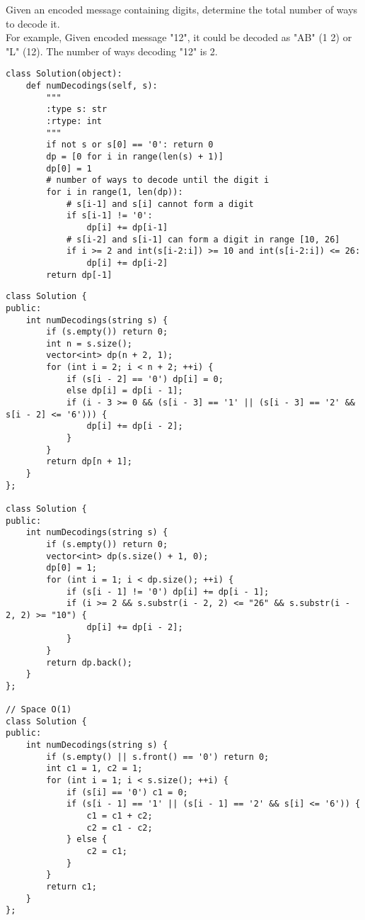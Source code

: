 Given an encoded message containing digits, determine the total number of ways to decode it.\\

For example,
Given encoded message "12", it could be decoded as "AB" (1 2) or "L" (12). The number of ways decoding "12" is 2. \\

\begin{lstlisting}
class Solution(object):
    def numDecodings(self, s):
        """
        :type s: str
        :rtype: int
        """
        if not s or s[0] == '0': return 0
        dp = [0 for i in range(len(s) + 1)]
        dp[0] = 1
        # number of ways to decode until the digit i
        for i in range(1, len(dp)):
            # s[i-1] and s[i] cannot form a digit
            if s[i-1] != '0':
                dp[i] += dp[i-1]
            # s[i-2] and s[i-1] can form a digit in range [10, 26]
            if i >= 2 and int(s[i-2:i]) >= 10 and int(s[i-2:i]) <= 26:
                dp[i] += dp[i-2]
        return dp[-1]
 \end{lstlisting}

\begin{lstlisting}
class Solution {
public:
    int numDecodings(string s) {
        if (s.empty()) return 0;
        int n = s.size();
        vector<int> dp(n + 2, 1);
        for (int i = 2; i < n + 2; ++i) {
            if (s[i - 2] == '0') dp[i] = 0;
            else dp[i] = dp[i - 1];
            if (i - 3 >= 0 && (s[i - 3] == '1' || (s[i - 3] == '2' && s[i - 2] <= '6'))) {
                dp[i] += dp[i - 2];
            }
        }
        return dp[n + 1];
    }
};

class Solution {
public:
    int numDecodings(string s) {
        if (s.empty()) return 0;
        vector<int> dp(s.size() + 1, 0);
        dp[0] = 1;
        for (int i = 1; i < dp.size(); ++i) {
            if (s[i - 1] != '0') dp[i] += dp[i - 1];
            if (i >= 2 && s.substr(i - 2, 2) <= "26" && s.substr(i - 2, 2) >= "10") {
                dp[i] += dp[i - 2];
            }
        }
        return dp.back();
    }
};

// Space O(1)
class Solution {
public:
    int numDecodings(string s) {
        if (s.empty() || s.front() == '0') return 0;
        int c1 = 1, c2 = 1;
        for (int i = 1; i < s.size(); ++i) {
            if (s[i] == '0') c1 = 0;
            if (s[i - 1] == '1' || (s[i - 1] == '2' && s[i] <= '6')) {
                c1 = c1 + c2;
                c2 = c1 - c2;
            } else {
                c2 = c1;
            }
        }
        return c1;
    }
};
\end{lstlisting}

